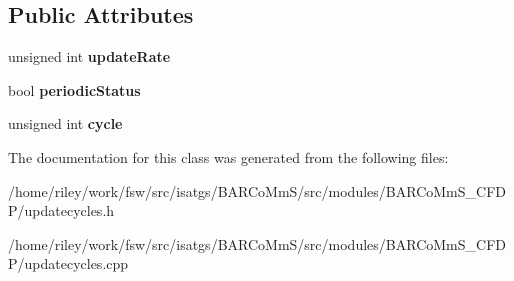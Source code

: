 \subsection*{Public Attributes}
\begin{DoxyCompactItemize}
\item 
unsigned int {\bfseries update\+Rate}\hypertarget{class_update_cycles_aab54669830d6deb837c721a51bcf11f2}{}\label{class_update_cycles_aab54669830d6deb837c721a51bcf11f2}

\item 
bool {\bfseries periodic\+Status}\hypertarget{class_update_cycles_a8e0729104e8b8b77431ebcc28daba97c}{}\label{class_update_cycles_a8e0729104e8b8b77431ebcc28daba97c}

\item 
unsigned int {\bfseries cycle}\hypertarget{class_update_cycles_a55f1973f92b1ee653dd7dd585f687249}{}\label{class_update_cycles_a55f1973f92b1ee653dd7dd585f687249}

\end{DoxyCompactItemize}


The documentation for this class was generated from the following files\+:\begin{DoxyCompactItemize}
\item 
/home/riley/work/fsw/src/isatgs/\+B\+A\+R\+Co\+Mm\+S/src/modules/\+B\+A\+R\+Co\+Mm\+S\+\_\+\+C\+F\+D\+P/updatecycles.\+h\item 
/home/riley/work/fsw/src/isatgs/\+B\+A\+R\+Co\+Mm\+S/src/modules/\+B\+A\+R\+Co\+Mm\+S\+\_\+\+C\+F\+D\+P/updatecycles.\+cpp\end{DoxyCompactItemize}
